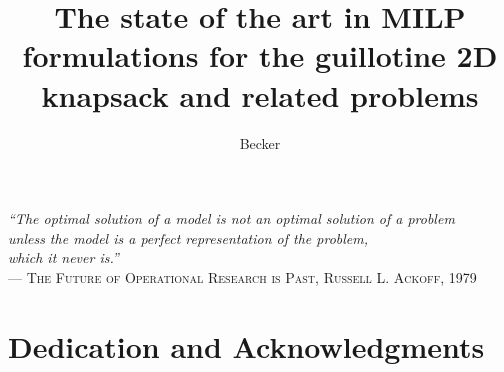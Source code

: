 \documentclass[ppgc,tese,english,formais,babel]{iiufrgs}
\title{The state of the art in MILP formulations for the guillotine 2D knapsack and related problems %
}
\author{Becker}{Henrique}
\begin{document}
\maketitle

\clearpage
\begin{flushright}
\mbox{}\vfill
{\sffamily\itshape
``The optimal solution of a model is not an optimal solution of a problem\\
unless the model is a perfect representation of the problem,\\
which it never is.''\\}
--- \textsc{The Future of Operational Research is Past, Russell L. Ackoff, 1979}
\end{flushright}

\chapter*{Dedication and Acknowledgments}
\end{document}
